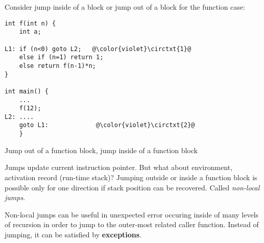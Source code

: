 Consider jump inside of a block or jump out of a block for the function case:
\begin{listing}[H]
\begin{verbatim}
int f(int n) {
    int a;

L1: if (n<0) goto L2;   @\color{violet}\circtxt{1}@
    else if (n=1) return 1;
    else return f(n-1)*n;
}

int main() {
    ...
    f(12);
L2: ....
    goto L1:             @\color{violet}\circtxt{2}@
    }
\end{verbatim}
\caption{Jump out of a function block, jump inside of a function block}
\label{code:code4}
\end{listing} 

Jumps update current instruction pointer. But what about environment, activation record (run-time stack)? Jumping outside or inside a function block is possible only for one direction if stack position can be
recovered. Called \textit{non-local jumps}.






Non-local jumps can be useful in unexpected error occuring inside of many levels of recursion in order to jump to the outer-most related caller function. Instead of jumping, it can be satisfied by \textbf{exceptions}.
